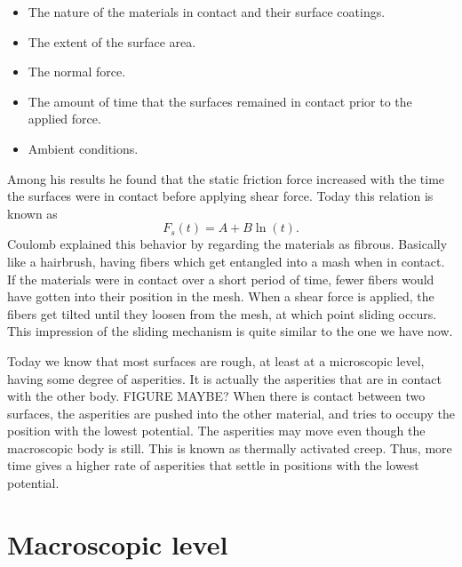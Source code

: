 \documentclass[twoside,english]{uiofysmaster}
\begin{document}
\begin{itemize}
	\item The nature of the materials in contact and their surface coatings.
	\item The extent of the surface area.
	\item The normal force.
	\item The amount of time that the surfaces remained in contact prior to the applied force.
	\item Ambient conditions.
\end{itemize}   
Among his results he found that the static friction force increased with the time the surfaces were in contact before applying shear force. 
Today this relation is known as
\begin{equation}
	F_s(t) = A+B\ln(t).
\end{equation}
Coulomb explained this behavior by regarding the materials as fibrous. 
Basically like a hairbrush, having fibers which get entangled into a mash when in contact. 
If the materials were in contact over a short period of time, fewer fibers would have gotten into their position in the mesh. 
When a shear force is applied, the fibers get tilted until they loosen from the mesh, at which point sliding occurs. 
This impression of the sliding mechanism is quite similar to the one we have now. 

Today we know that most surfaces are rough, at least at a microscopic level, having some degree of asperities. 
It is actually the asperities that are in contact with the other body. 
{\huge FIGURE MAYBE? } 
When there is contact between two surfaces, the asperities are pushed into the other material, and tries to occupy the position with the lowest potential.  
The asperities may move even though the macroscopic body is still. 
This is known as thermally activated creep.
Thus, more time gives a higher rate of asperities that settle in positions with the lowest potential. 
 


\section{Macroscopic level}
\end{document}
